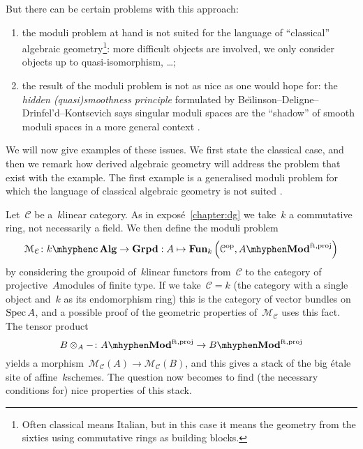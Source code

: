 \begin{refsection}
But there can be certain problems with this approach:
\begin{enumerate}
  \item the moduli problem at hand is not suited for the language of ``classical'' algebraic geometry\footnote{Often classical means Italian, but in this case it means the geometry from the sixties using commutative rings as building blocks.}: more difficult objects are involved, we only consider objects up to quasi-isomorphism, \dots;
  \item the result of the moduli problem is not as nice as one would hope for: the \emph{hidden (quasi)smooth\-ness principle} formulated by Be\u\i linson--Deligne--Drinfel'd--Kontsevich says singular moduli spaces are the ``shadow'' of smooth moduli spaces in a more general context \cite[sections 1.4 and 5.1]{kontsevich}.
\end{enumerate}
We will now give examples of these issues. We first state the classical case, and then we remark how derived algebraic geometry will address the problem that exist with the example. The first example is a generalised moduli problem for which the language of classical algebraic geometry is not suited \cite[section 1]{toen-vaquie}.
\begin{example}
  Let~$\mathcal{C}$ be a~$k$\dash linear category. As in expos\'e~\ref{chapter:dg} we take~$k$ a commutative ring, not necessarily a field. We then define the moduli problem
  \begin{equation}
    \label{equation:moduli-linear-category}
    \mathcal{M}_{\mathcal{C}}\colon k\mhyphen\mathbf{c\,Alg}\to\mathbf{Grpd}:A\mapsto\Fun_k\left( \mathcal{C}^\opp,A\mhyphen\Mod^{\mathrm{ft,proj}} \right)
  \end{equation}
  by considering the groupoid of~$k$\dash linear functors from~$\mathcal{C}$ to the category of projective~$A$\dash modules of finite type. If we take~$\mathcal{C}=k$ (the category with a single object and~$k$ as its endomorphism ring) this is the category of vector bundles on~$\operatorname{Spec} A$, and a possible proof of the geometric properties of~$\mathcal{M}_{\mathcal{C}}$ uses this fact. The tensor product
  \begin{equation}
    B\otimes_A-\colon A\mhyphen\Mod^{\mathrm{ft,proj}}\to B\mhyphen\Mod^{\mathrm{ft,proj}}
  \end{equation}
  yields a morphism~$\mathcal{M}_{\mathcal{C}}(A)\to\mathcal{M}_{\mathcal{C}}(B)$, and this gives a stack of the big \'etale site of affine~$k$\dash schemes. The question now becomes to find (the necessary conditions for) nice properties of this stack.


\end{example}
\end{refsection}

